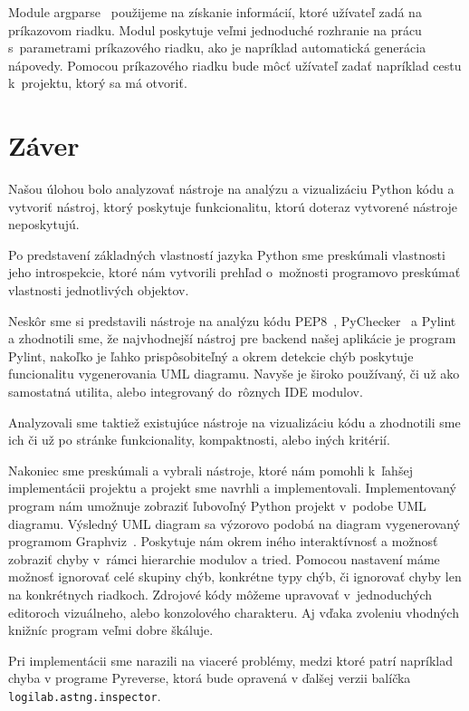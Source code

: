 \documentclass[11pt,oneside,final]{fithesis2}
\begin{document}
		Module argparse~\cite{argparse} použijeme na získanie informácií, ktoré užívateľ zadá na príkazovom riadku. Modul poskytuje veľmi jednoduché rozhranie na prácu s~parametrami príkazového riadku, ako je napríklad automatická generácia nápovedy. Pomocou príkazového riadku bude môcť užívateľ zadať napríklad cestu k~projektu, ktorý sa má otvoriť.
				
					
				
\chapter{Záver}

	Našou úlohou bolo analyzovať nástroje na analýzu a vizualizáciu Python kódu a vytvoriť nástroj, ktorý poskytuje funkcionalitu, ktorú doteraz vytvorené nástroje neposkytujú.
	
	Po predstavení základných vlastností jazyka Python sme preskúmali vlastnosti jeho introspekcie, ktoré nám vytvorili prehľad o~možnosti programovo preskúmať vlastnosti jednotlivých objektov.
	
	Neskôr sme si predstavili nástroje na analýzu kódu PEP8~\cite{pep8}, PyChecker~\cite{pychecker} a Pylint~\cite{pylint} a zhodnotili sme, že najvhodnejší nástroj pre backend našej aplikácie je program Pylint, nakoľko je ľahko prispôsobiteľný a okrem detekcie chýb poskytuje funcionalitu vygenerovania UML diagramu. Navyše je široko používaný, či už ako samostatná utilita, alebo integrovaný do~rôznych IDE modulov.
	
	Analyzovali sme taktiež existujúce nástroje na vizualizáciu kódu a zhodnotili sme ich či už po stránke funkcionality, kompaktnosti, alebo iných kritérií.
	
	Nakoniec sme preskúmali a vybrali nástroje, ktoré nám pomohli k~ľahšej implementácii projektu a projekt sme navrhli a implementovali.
	Implementovaný program nám umožnuje zobraziť ľubovoľný Python projekt v~podobe UML diagramu.  Výsledný UML diagram sa výzorovo podobá na diagram vygenerovaný programom Graphviz~\cite{graphviz}. Poskytuje nám okrem iného interaktívnosť a možnosť zobraziť chyby v~rámci hierarchie modulov a tried. Pomocou nastavení máme možnosť ignorovať celé skupiny chýb, konkrétne typy chýb, či ignorovať chyby len na konkrétnych riadkoch. Zdrojové kódy môžeme upravovať v~jednoduchých editoroch vizuálneho, alebo konzolového charakteru. Aj vďaka zvoleniu vhodných knižníc program veľmi dobre škáluje.
	
	Pri implementácii sme narazili na viaceré problémy, medzi ktoré patrí napríklad chyba v programe Pyreverse, ktorá bude opravená v ďalšej verzii balíčka \texttt{logilab.astng.inspector}.
	
\end{document}
